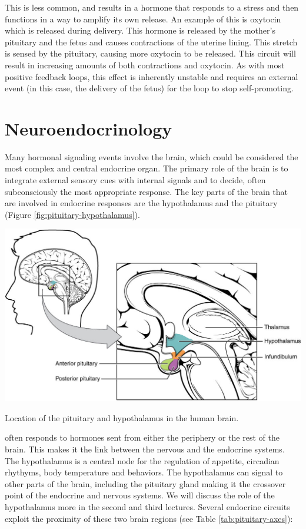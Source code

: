 \documentclass{tufte-handout}
\begin{document}
  This is less common, and results in a hormone that responds to a stress and then functions in a way to amplify its own release.  An example of this is oxytocin which is released during delivery.  This hormone is released by the mother's pituitary and the fetus and causes contractions of the uterine lining.  This stretch is sensed by the pituitary, causing more oxytocin to be released.  This circuit will result in increasing amounts of both contractions and oxytocin.  As with most positive feedback loops, this effect is inherently unstable and requires an external event (in this case, the delivery of the fetus) for the loop to stop self-promoting.

\section{Neuroendocrinology}

Many hormonal signaling events involve the brain, which could be considered the most complex and central endocrine organ.  The primary role of the brain is to integrate external sensory cues with internal signals and to decide, often subconsciously the most appropriate response.  The key parts of the brain that are involved in endocrine responses are the hypothalamus and the pituitary (Figure \ref{fig:pituitary-hypothalamus}).

\begin{marginfigure}
  \includegraphics{figures/pituitary-hypothalamus}
  \caption{Location of the pituitary and hypothalamus in the human brain.}
    \label{fig:pituitary-hypothalamus}
\end{marginfigure}

 often responds to hormones sent from either the periphery or the rest of the brain.  This makes it the link between the nervous and the endocrine systems.  The hypothalamus is a central node for the regulation of appetite, circadian rhythyms, body temperature and behaviors.  The hypothalamus can signal to other parts of the brain, including the pituitary gland making it the crossover point of the endocrine and nervous systems.  We will discuss the role of the hypothalamus more in the second and third lectures.  Several endocrine circuits exploit the proximity of these two brain regions (see Table \ref{tab:pituitary-axes}):
\end{document}
